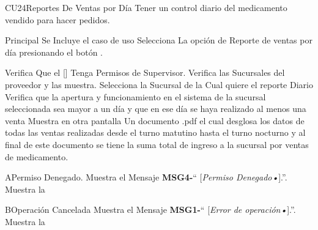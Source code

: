 \begin{UseCase}{CU24}{Reportes De Ventas por Día}{
	Tener un control diario del medicamento vendido para hacer pedidos.
	}
	\end{UseCase}
	\begin{UCtrayectoria}{Principal}
		\UCpaso Se Incluye el caso de uso 
		\UCpaso[\UCactor] Selecciona La opción de Reporte de ventas por día presionando el botón .

		\UCpaso Verifica Que el [\UCactor] Tenga Permisos de Supervisor.
		\UCpaso Verifica las Sucursales del proveedor y las muestra.
		\UCpaso [\UCactor] Selecciona la Sucursal de la Cual quiere el reporte Diario
		\UCpaso Verifica que la apertura y funcionamiento en el sistema de la sucursal seleccionada sea mayor a un día y que en ese día se haya realizado al menos una venta
		\UCpaso Muestra en otra pantalla Un documento .pdf el cual desglosa los datos de todas las ventas realizadas desde el turno matutino hasta el turno nocturno y al final de este documento se tiene la suma total de ingreso a la sucursal por ventas de medicamento.
	\end{UCtrayectoria}



\begin{UCtrayectoriaA}{A}{Permiso Denegado.}
			\UCpaso Muestra el Mensaje {\bf MSG4-}`` [{\em Permiso Denegado\textsl{•}}].''.
			\UCpaso Muestra la 
\end{UCtrayectoriaA}
\begin{UCtrayectoriaA}{B}{Operación Cancelada}
	\UCpaso Muestra el Mensaje {\bf MSG1-}`` [{\em Error de operación\textsl{•}}].''.
			\UCpaso Muestra la 
\end{UCtrayectoriaA}